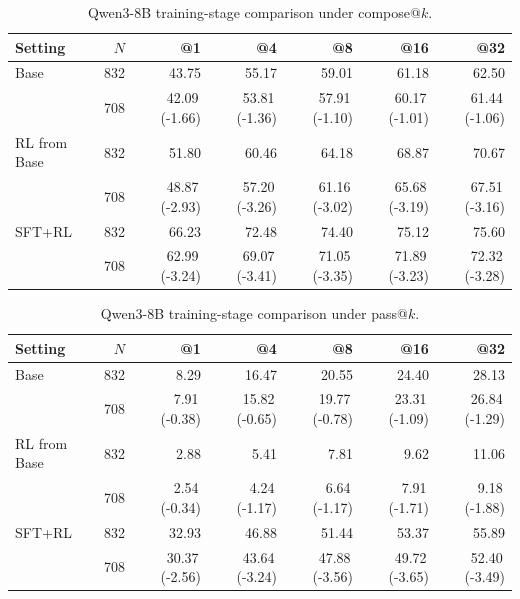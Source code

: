 \documentclass[10pt]{article}
\newcommand{\pp}[1]{\,({#1})}
\begin{document}
\begin{table}[H]
\centering
\begin{tabular}{lrrrrrr}
\toprule
\rowcolor{headerbg}
Setting & \(N\) & @1 & @4 & @8 & @16 & @32 \\
\midrule
Base         & 832 & 43.75 & 55.17 & 59.01 & 61.18 & 62.50 \\
             & 708 & 42.09\pp{-1.66} & 53.81\pp{-1.36} & 57.91\pp{-1.10} & 60.17\pp{-1.01} & 61.44\pp{-1.06} \\
\addlinespace
RL from Base & 832 & 51.80 & 60.46 & 64.18 & 68.87 & 70.67 \\
             & 708 & 48.87\pp{-2.93} & 57.20\pp{-3.26} & 61.16\pp{-3.02} & 65.68\pp{-3.19} & 67.51\pp{-3.16} \\
\addlinespace
SFT+RL       & 832 & 66.23 & 72.48 & 74.40 & 75.12 & 75.60 \\
             & 708 & 62.99\pp{-3.24} & 69.07\pp{-3.41} & 71.05\pp{-3.35} & 71.89\pp{-3.23} & 72.32\pp{-3.28} \\
\bottomrule
\end{tabular}
\caption{Qwen3-8B training-stage comparison under compose@\(k\).}
\label{tab:supp-stage-compose}
\end{table}

\begin{table}[H]
\centering
\begin{tabular}{lrrrrrr}
\toprule
\rowcolor{headerbg}
Setting & \(N\) & @1 & @4 & @8 & @16 & @32 \\
\midrule
Base         & 832 & 8.29 & 16.47 & 20.55 & 24.40 & 28.13 \\
             & 708 & 7.91\pp{-0.38} & 15.82\pp{-0.65} & 19.77\pp{-0.78} & 23.31\pp{-1.09} & 26.84\pp{-1.29} \\
\addlinespace
RL from Base & 832 & 2.88 & 5.41 & 7.81 & 9.62 & 11.06 \\
             & 708 & 2.54\pp{-0.34} & 4.24\pp{-1.17} & 6.64\pp{-1.17} & 7.91\pp{-1.71} & 9.18\pp{-1.88} \\
\addlinespace
SFT+RL       & 832 & 32.93 & 46.88 & 51.44 & 53.37 & 55.89 \\
             & 708 & 30.37\pp{-2.56} & 43.64\pp{-3.24} & 47.88\pp{-3.56} & 49.72\pp{-3.65} & 52.40\pp{-3.49} \\
\bottomrule
\end{tabular}
\caption{Qwen3-8B training-stage comparison under pass@\(k\).}
\label{tab:supp-stage-pass}
\end{table}

\end{document}
